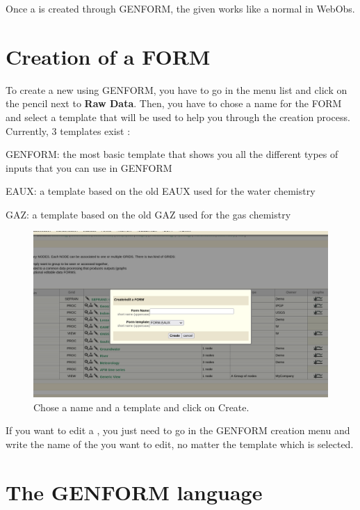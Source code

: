 Once a  is created through GENFORM, the given  works like a normal  in WebObs.

\section{Creation of a FORM} \label{genform_creation}

To create a new  using GENFORM, you have to go in the  menu list and click on the pencil next to \textbf{Raw Data}. Then, you have to chose a name for the FORM and select a template that will be used to help you through the creation process. Currently, 3 templates exist : 

\begin{list}
	\item GENFORM: the most basic template that shows you all the different types of inputs that you can use in GENFORM
	\item EAUX: a template based on the old EAUX  used for the water chemistry
	\item GAZ: a template based on the old GAZ  used for the gas chemistry
\end{list}

\begin{figure}[!h]
	\centering
	\includegraphics[width=\textwidth]{figures/GENFORM_creation.png}
	\caption{Chose a name and a template and click on Create.}
	\label{GENFORM_creation}
\end{figure}

If you want to edit a , you just need to go in the GENFORM creation menu and write the name of the  you want to edit, no matter the template which is selected.

\section{The GENFORM language}

